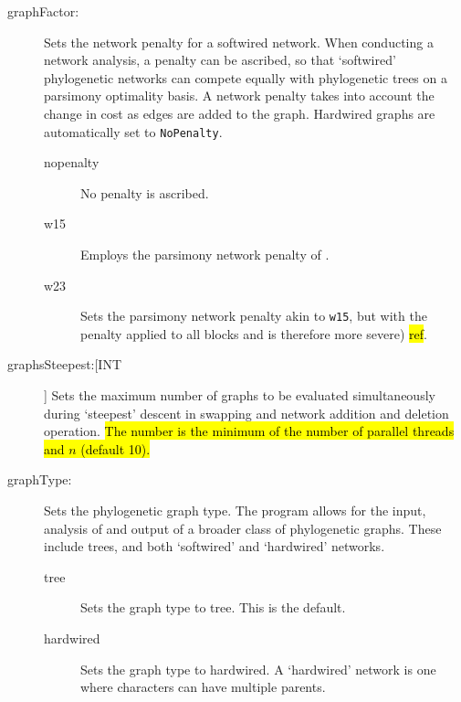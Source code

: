 \begin{description}
			
			
		\item[graphFactor:] Sets the network penalty for a softwired network. When conducting 
		a network analysis, a penalty can be ascribed, so that ‘softwired’ phylogenetic networks 
		can compete equally with phylogenetic trees on a parsimony optimality basis. A network 
		penalty takes into account the change in cost as edges are added to the graph. Hardwired 
		graphs are automatically set to \texttt{NoPenalty}.
			
			\begin{description}
			\item[nopenalty] No penalty is ascribed.	

			\item[w15] Employs the parsimony network penalty of \cite{Wheeler2015}.	
		
			\item[w23] Sets the parsimony network penalty akin to \texttt{w15}, but with the 
			penalty applied to all blocks and is therefore more severe) \hl{ref}.		
			\end{description}
			
			
		\item[graphsSteepest:[INT]] Sets the maximum number of graphs to be evaluated 
		simultaneously during `steepest' descent in swapping and network addition and 
		deletion operation. \hl{The number is the minimum of the number of parallel threads 
		and $n$ (default 10).}
			
		\item[graphType:] Sets the phylogenetic graph type. The program allows for the input, 
		analysis of and output of a broader class of phylogenetic graphs. These include trees, 
		and both `softwired’ and `hardwired’ networks. 
			
			\begin{description}
			\item[tree] Sets the graph type to tree. This is the default.
		
			\item[hardwired]  Sets the graph type to hardwired. A `hardwired' network is 
			one where characters can have multiple parents.
	

\end{description}
\end{description}
